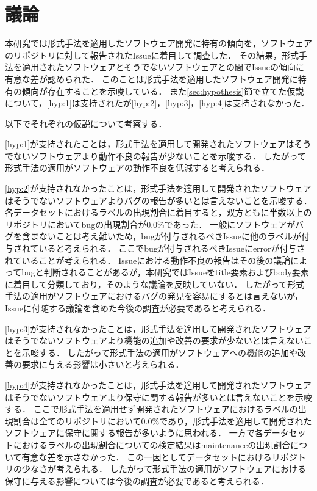 \documentclass[main]{subfiles}
\begin{document}
\chapter{議論}

本研究では形式手法を適用したソフトウェア開発に特有の傾向を，ソフトウェアのリポジトリに対して報告されたIssueに着目して調査した．
その結果，形式手法を適用されたソフトウェアとそうでないソフトウェアとの間でIssueの傾向に有意な差が認められた．
このことは形式手法を適用したソフトウェア開発に特有の傾向が存在することを示唆している．
また\ref{sec:hypothesis}節で立てた仮説について，\ref{hyp:1}は支持されたが\ref{hyp:2}，\ref{hyp:3}，\ref{hyp:4}は支持されなかった．

以下でそれぞれの仮説について考察する．

\ref{hyp:1}が支持されたことは，形式手法を適用して開発されたソフトウェアはそうでないソフトウェアより動作不良の報告が少ないことを示唆する．
したがって形式手法の適用がソフトウェアの動作不良を低減すると考えられる．

\ref{hyp:2}が支持されなかったことは，形式手法を適用して開発されたソフトウェアはそうでないソフトウェアよりバグの報告が多いとは言えないことを示唆する．
各データセットにおけるラベルの出現割合に着目すると，双方ともに半数以上のリポジトリにおいてbugの出現割合が0.0\%であった．
一般にソフトウェアがバグを含まないことは考え難いため，bugが付与されるべきIssueに他のラベルが付与されていると考えられる．
ここでbugが付与されるべきIssueにerrorが付与されていることが考えられる．
Issueにおける動作不良の報告はその後の議論によってbugと判断されることがあるが，本研究ではIssueをtitle要素およびbody要素に着目して分類しており，そのような議論を反映していない．
したがって形式手法の適用がソフトウェアにおけるバグの発見を容易にするとは言えないが，Issueに付随する議論を含めた今後の調査が必要であると考えられる．

\ref{hyp:3}が支持されなかったことは，形式手法を適用して開発されたソフトウェアはそうでないソフトウェアより機能の追加や改善の要求が少ないとは言えないことを示唆する．
したがって形式手法の適用がソフトウェアへの機能の追加や改善の要求に与える影響は小さいと考えられる．

\ref{hyp:4}が支持されなかったことは，形式手法を適用して開発されたソフトウェアはそうでないソフトウェアより保守に関する報告が多いとは言えないことを示唆する．
ここで形式手法を適用せず開発されたソフトウェアにおけるラベルの出現割合は全てのリポジトリにおいて0.0\%であり，形式手法を適用して開発されたソフトウェアに保守に関する報告が多いように思われる．
一方で各データセットにおけるラベルの出現割合についての検定結果はmaintenanceの出現割合について有意な差を示さなかった．
この一因としてデータセットにおけるリポジトリの少なさが考えられる．
したがって形式手法の適用がソフトウェアにおける保守に与える影響については今後の調査が必要であると考えられる．
\end{document}
